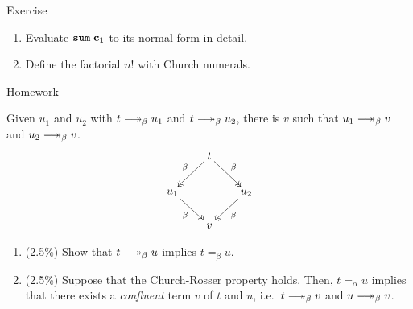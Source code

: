 
\begin{frame}{Exercise}
  \begin{enumerate}
    \item Evaluate $\mathtt{sum}\;\mathbf{c}_1$ to its normal form in detail.
    \item Define the factorial $n!$ with Church numerals.
  \end{enumerate}
\end{frame}

\begin{frame}{Homework}
  \begin{theorem}
    Given $u_1$ and $u_2$ with $t \reduce u_1$ and $t\reduce u_2$, there is $v$
    such that $u_1 \reduce v$ and $u_2 \reduce v$. 
    \[
      \xymatrix@-4.8pt{
        & t \ar@{->>}[rd]^{\beta} \ar@{->>}[ld]_{\beta} \\
        u_1 \ar@{->>}[rd]_{\beta} & & u_2 \ar@{->>}[ld]^{\beta} \\
        & v
      }
    \]
  \end{theorem}
  \begin{enumerate}
    \item (2.5\%) Show that $t \reduce u$ implies $t =_\beta u$. 
    \item (2.5\%) Suppose that the Church-Rosser property holds.
      Then, $t =_\alpha u$ implies that there exists a \emph{confluent} term $v$ of $t$ and $u$, i.e.\ $t \reduce v$ and $u \reduce v$.
  \end{enumerate}
\end{frame}

